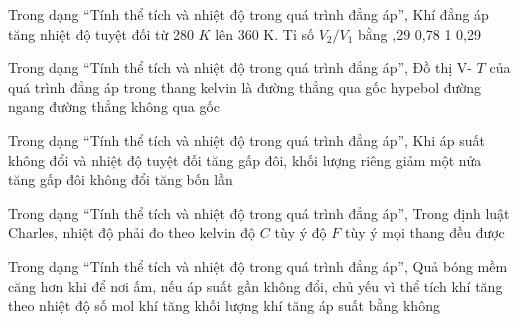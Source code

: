 \begin{ex}
Trong dạng “Tính thể tích và nhiệt độ trong quá trình đẳng áp”, Khí đẳng áp tăng nhiệt độ tuyệt đối từ 280 $K$ lên 360 K. Tỉ số $V_2/V_1$ bằng
\choice
{,29}
{0,78}
{1}
{0,29}
\end{ex}

\begin{ex}
Trong dạng “Tính thể tích và nhiệt độ trong quá trình đẳng áp”, Đồ thị V- $T$ của quá trình đẳng áp trong thang kelvin là
\choice
{\True đường thẳng qua gốc}
{hypebol}
{đường ngang}
{đường thẳng không qua gốc}
\end{ex}

\begin{ex}
Trong dạng “Tính thể tích và nhiệt độ trong quá trình đẳng áp”, Khi áp suất không đổi và nhiệt độ tuyệt đối tăng gấp đôi, khối lượng riêng
\choice
{\True giảm một nửa}
{tăng gấp đôi}
{không đổi}
{tăng bốn lần}
\end{ex}

\begin{ex}
Trong dạng “Tính thể tích và nhiệt độ trong quá trình đẳng áp”, Trong định luật Charles, nhiệt độ phải đo theo
\choice
{\True kelvin}
{độ $C$ tùy ý}
{độ $F$ tùy ý}
{mọi thang đều được}
\end{ex}

\begin{ex}
Trong dạng “Tính thể tích và nhiệt độ trong quá trình đẳng áp”, Quả bóng mềm căng hơn khi để nơi ấm, nếu áp suất gần không đổi, chủ yếu vì
\choice
{\True thể tích khí tăng theo nhiệt độ}
{số mol khí tăng}
{khối lượng khí tăng}
{áp suất bằng không}
\end{ex}

